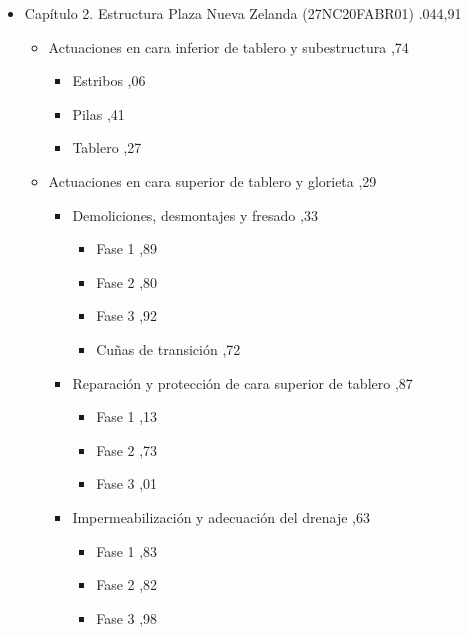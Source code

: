 \documentclass{book}%
\begin{document}
\begin{itemize}
\begin{itemize}
\begin{itemize}
Protecciones colectivas%
,35%
\item%
Higiene y bienestar%
,68%
\item%
Señalización de obra%
,72%
\end{itemize}%
\end{itemize}%
\item%
Capítulo 2. Estructura Plaza Nueva Zelanda (27NC20FABR01)%
.044,91%
\begin{itemize}%
\item%
Actuaciones en cara inferior de tablero y subestructura%
,74%
\begin{itemize}%
\item%
Estribos%
,06%
\item%
Pilas%
,41%
\item%
Tablero%
,27%
\end{itemize}%
\item%
Actuaciones en cara superior de tablero y glorieta%
,29%
\begin{itemize}%
\item%
Demoliciones, desmontajes y fresado%
,33%
\begin{itemize}%
\item%
Fase 1%
,89%
\item%
Fase 2%
,80%
\item%
Fase 3%
,92%
\item%
Cuñas de transición%
,72%
\end{itemize}%
\item%
Reparación y protección de cara superior de tablero%
,87%
\begin{itemize}%
\item%
Fase 1%
,13%
\item%
Fase 2%
,73%
\item%
Fase 3%
,01%
\end{itemize}%
\item%
Impermeabilización y adecuación del drenaje%
,63%
\begin{itemize}%
\item%
Fase 1%
,83%
\item%
Fase 2%
,82%
\item%
Fase 3%
,98%
\end{itemize}%

\end{itemize}
\end{itemize}
\end{itemize}
\end{document}

